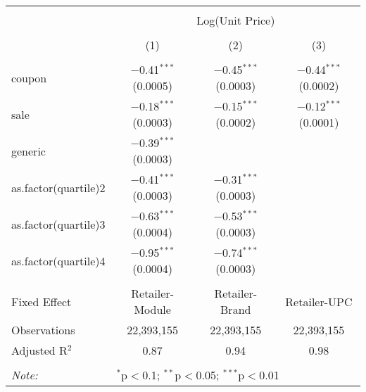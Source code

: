 
\begin{table}[!htbp] \centering 
  \caption{} 
  \label{tab:overallSavingsStorable} 
\begin{tabular}{@{\extracolsep{5pt}}lccc} 
\\[-1.8ex]\hline 
\hline \\[-1.8ex] 
 & \multicolumn{3}{c}{Log(Unit Price)} \\ 
\\[-1.8ex] & (1) & (2) & (3)\\ 
\hline \\[-1.8ex] 
 coupon & $-$0.41$^{***}$ (0.0005) & $-$0.45$^{***}$ (0.0003) & $-$0.44$^{***}$ (0.0002) \\ 
  sale & $-$0.18$^{***}$ (0.0003) & $-$0.15$^{***}$ (0.0002) & $-$0.12$^{***}$ (0.0001) \\ 
  generic & $-$0.39$^{***}$ (0.0003) &  &  \\ 
  as.factor(quartile)2 & $-$0.41$^{***}$ (0.0003) & $-$0.31$^{***}$ (0.0003) &  \\ 
  as.factor(quartile)3 & $-$0.63$^{***}$ (0.0004) & $-$0.53$^{***}$ (0.0003) &  \\ 
  as.factor(quartile)4 & $-$0.95$^{***}$ (0.0004) & $-$0.74$^{***}$ (0.0003) &  \\ 
 \hline \\[-1.8ex] 
Fixed Effect & Retailer-Module & Retailer-Brand & Retailer-UPC \\ 
Observations & 22,393,155 & 22,393,155 & 22,393,155 \\ 
Adjusted R$^{2}$ & 0.87 & 0.94 & 0.98 \\ 
\hline 
\hline \\[-1.8ex] 
\textit{Note:}  & \multicolumn{3}{l}{$^{*}$p$<$0.1; $^{**}$p$<$0.05; $^{***}$p$<$0.01} \\ 
\end{tabular} 
\end{table} 
